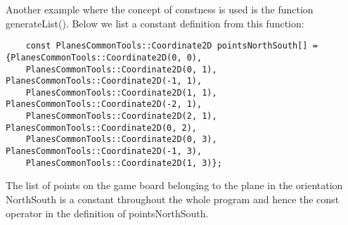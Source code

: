 Another example where the concept of constness is used is the function generateList(). Below we list a constant definition from this function:

\begin{lstlisting}
    const PlanesCommonTools::Coordinate2D pointsNorthSouth[] = {PlanesCommonTools::Coordinate2D(0, 0), 
    PlanesCommonTools::Coordinate2D(0, 1), PlanesCommonTools::Coordinate2D(-1, 1),
    PlanesCommonTools::Coordinate2D(1, 1), PlanesCommonTools::Coordinate2D(-2, 1), 
    PlanesCommonTools::Coordinate2D(2, 1), PlanesCommonTools::Coordinate2D(0, 2),
    PlanesCommonTools::Coordinate2D(0, 3), PlanesCommonTools::Coordinate2D(-1, 3),
    PlanesCommonTools::Coordinate2D(1, 3)};
\end{lstlisting}

The list of points on the game board  belonging to the plane in the orientation NorthSouth is a constant throughout the whole program and hence the const operator in the definition of pointsNorthSouth.
